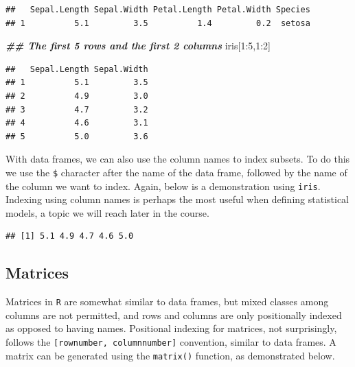 \documentclass[
]{book}
\newenvironment{Shaded}{\begin{snugshade}}{\end{snugshade}}
\newcommand{\DecValTok}[1]{\textcolor[rgb]{0.00,0.00,0.81}{#1}}
\newcommand{\DocumentationTok}[1]{\textcolor[rgb]{0.56,0.35,0.01}{\textbf{\textit{#1}}}}
\newcommand{\NormalTok}[1]{#1}
\newcommand{\SpecialCharTok}[1]{\textcolor[rgb]{0.00,0.00,0.00}{#1}}
\begin{document}
\begin{verbatim}
##   Sepal.Length Sepal.Width Petal.Length Petal.Width Species
## 1          5.1         3.5          1.4         0.2  setosa
\end{verbatim}

\begin{Shaded}
\begin{Highlighting}[]
\DocumentationTok{\#\# The first 5 rows and the first 2 columns}
\NormalTok{iris[}\DecValTok{1}\SpecialCharTok{:}\DecValTok{5}\NormalTok{,}\DecValTok{1}\SpecialCharTok{:}\DecValTok{2}\NormalTok{]}
\end{Highlighting}
\end{Shaded}

\begin{verbatim}
##   Sepal.Length Sepal.Width
## 1          5.1         3.5
## 2          4.9         3.0
## 3          4.7         3.2
## 4          4.6         3.1
## 5          5.0         3.6
\end{verbatim}

With data frames, we can also use the column names to index subsets. To do this we use the \texttt{\$} character after the name of the data frame, followed by the name of the column we want to index. Again, below is a demonstration using \texttt{iris}. Indexing using column names is perhaps the most useful when defining statistical models, a topic we will reach later in the course.

\begin{Shaded}
\end{Shaded}

\begin{verbatim}
## [1] 5.1 4.9 4.7 4.6 5.0
\end{verbatim}

\hypertarget{matrices}{%
\subsection{Matrices}\label{matrices}}

Matrices in \texttt{R} are somewhat similar to data frames, but mixed classes among columns are not permitted, and rows and columns are only positionally indexed as opposed to having names. Positional indexing for matrices, not surprisingly, follows the \texttt{{[}rownumber,\ columnnumber{]}} convention, similar to data frames. A matrix can be generated using the \texttt{matrix()} function, as demonstrated below.
\end{document}

